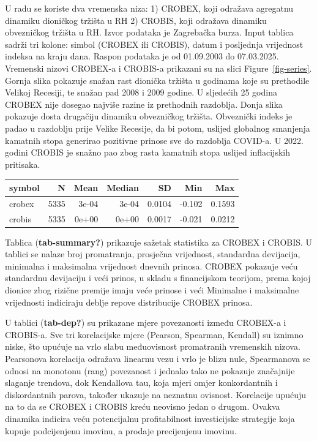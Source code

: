 \documentclass[
  letterpaper,
  DIV=11,
  numbers=noendperiod]{scrartcl}
\begin{document}
U radu se koriste dva vremenska niza: 1) CROBEX, koji odražava agregatnu
dinamiku dioničkog tržišta u RH 2) CROBIS, koji odražava dinamiku
obvezničkog tržišta u RH. Izvor podataka je Zagrebačka burza. Input
tablica sadrži tri kolone: simbol (CROBEX ili CROBIS), datum i
posljednja vrijednost indeksa na kraju dana. Raspon podataka je od
01.09.2003 do 07.03.2025. Vremenski nizovi CROBEX-a i CROBIS-a prikazani
su na slici Figure~\ref{fig-series}. Gornja slika pokazuje snažan rast
dionička tržišta u godinama koje su prethodile Velikoj Recesiji, te
snažan pad 2008 i 2009 godine. U sljedećih 25 godina CROBEX nije dosegao
najviše razine iz prethodnih razdoblja. Donja slika pokazuje dosta
drugačiju dinamiku obvezničkog tržišta. Obveznički indeks je padao u
razdoblju prije Velike Recesije, da bi potom, uslijed globalnog
smanjenja kamatnih stopa generirao pozitivne prinose sve do razdoblja
COVID-a. U 2022. godini CROBIS je snažno pao zbog rasta kamatnih stopa
uslijed inflacijskih pritisaka.

\begin{tabular}[t]{l|r|r|r|r|r|r}
\hline
symbol & N & Mean & Median & SD & Min & Max\\
\hline
crobex & 5335 & 3e-04 & 3e-04 & 0.0104 & -0.102 & 0.1593\\
\hline
crobis & 5335 & 0e+00 & 0e+00 & 0.0017 & -0.021 & 0.0212\\
\hline
\end{tabular}

Tablica (\textbf{tab-summary?}) prikazuje sažetak statistika za CROBEX i
CROBIS. U tablici se nalaze broj promatranja, prosječna vrijednost,
standardna devijacija, minimalna i maksimalna vrijednost dnevnih
prinosa. CROBEX pokazuje veću standardnu devijaciju i veći prinos, u
skladu s financijskom teorijom, prema kojoj dionice zbog rizične premije
imaju veće prinose i veći Minimalne i maksimalne vrijednosti indiciraju
deblje repove distribucije CROBEX prinosa.

U tablici (\textbf{tab-dep?}) su prikazane mjere povezanosti između
CROBEX-a i CROBIS-a. Sve tri korelacijske mjere (Pearson, Spearman,
Kendall) su iznimno niske, što upućuje na vrlo slabu međuovisnost
promatranih vremenskih nizova. Pearsonova korelacija odražava linearnu
vezu i vrlo je blizu nule, Spearmanova se odnosi na monotonu (rang)
povezanost i jednako tako ne pokazuje značajnije slaganje trendova, dok
Kendallova tau, koja mjeri omjer konkordantnih i diskordantnih parova,
također ukazuje na neznatnu ovisnost. Korelacije upućuju na to da se
CROBEX i CROBIS kreću neovisno jedan o drugom. Ovakva dinamika indicira
veću potencijalnu profitabilnost investicijske strategije koja kupuje
podcijenjenu imovinu, a prodaje precijenjenu imovinu.
\end{document}
